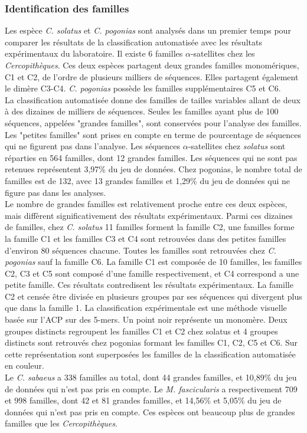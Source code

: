 \documentclass[12pt,a4paper]{article}
\begin{document}
			\subsubsection{Identification des familles}
			Les espèce \textit{C. solatus} et \textit{C. pogonias} sont analysés dans un premier temps pour comparer les résultats de la classification automatisée avec les résultats expérimentaux du laboratoire. Il existe 6 familles $\alpha$-satellites chez les \textit{Cercopithèques}. Ces deux espèces partagent deux grandes familles monomériques, C1 et C2, de l'ordre de plusieurs milliers de séquences. Elles partagent également le dimère C3-C4. \textit{C. pogonias} possède les familles supplémentaires C5 et C6.\\
			La classification automatisée donne des familles de tailles variables allant de deux  à des dizaines de milliers de séquences. Seules les familles ayant plus de 100 séquences, appelées "grandes familles", sont conservées pour l'analyse des familles. Les "petites familles" sont prises en compte en terme de pourcentage de séquences qui ne figurent pas dans l'analyse. Les séquences $\alpha$-satellites chez \textit{solatus} sont réparties en 564 familles, dont 12 grandes familles. Les séquences qui ne sont pas retenues représentent 3,97\% du jeu de données. Chez pogonias, le nombre total de familles est de 132, avec 13 grandes familles et 1,29\% du jeu de données qui  ne figure pas dans les analyses.\\
			 Le nombre de grandes familles est relativement proche entre ces deux espèces, mais diffèrent significativement des résultats expérimentaux. Parmi ces dizaines de familles, chez \textit{C. solatus} 11 familles forment la famille C2, une familles forme la famille C1 et les familles C3 et C4 sont retrouvées dans des petites familles d'environ 80 séquences chacune. Toutes les familles sont retrouvées chez \textit{C. pogonias} sauf la famille C6. La famille C1 est composée de 10 familles, les familles C2, C3 et C5 sont composé d'une famille respectivement, et C4 correspond a une petite famille. Ces résultats contredisent les résultats expérimentaux. La famille C2 et censée être divisée en plusieurs groupes par ses séquences qui divergent plus que dans la famille 1.  
			 La classification expérimentale est une méthode visuelle basée sur l'ACP sur des 5-mers. Un point noir représente un monomère. Deux groupes distincts regroupent les familles C1 et C2 chez solatus et 4 groupes distincts sont retrouvés chez pogonias formant les familles C1, C2, C5 et C6. Sur cette représentation sont superposées les familles de la classification automatisée en couleur. \\
			 Le \textit{C. sabaeus} a 338 familles au total, dont 44 grandes familles, et 10,89\% du jeu de données qui n'est pas pris en compte. Le \textit{M. fascicularis} a respectivement 709 et 998 familles, dont 42 et 81 grandes familles, et 14,56\% et 5,05\% du jeu de données qui n'est pas pris en compte. Ces espèces ont beaucoup plus de grandes familles que les \textit{Cercopithèques}. 
			 
\end{document}
